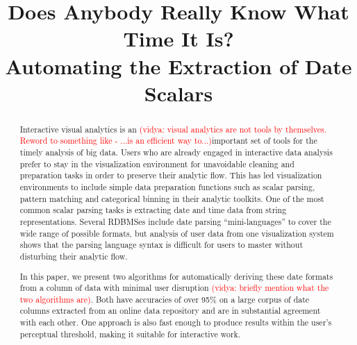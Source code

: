 \documentclass[conference]{IEEEtran}
\newcommand{\vidya}[1]{\textcolor{red}{(vidya: #1)}}
\begin{document}
\title{Does Anybody Really Know What Time It Is?\\
Automating the Extraction of Date Scalars}


\maketitle
\begin{abstract}
Interactive visual analytics is an \vidya{visual analytics are not tools by themselves. Reword to something like - ...is an efficient way to...}important set of tools for the timely analysis of big data. Users who are already engaged in interactive data analysis prefer to stay in the visualization environment for unavoidable cleaning and preparation tasks in order to preserve their analytic flow. This has led visualization environments to include simple data preparation functions such as scalar parsing, pattern matching and categorical binning in their analytic toolkits. One of the most common scalar parsing tasks is extracting date and time data from string representations. Several RDBMSes include date parsing ``mini-languages'' to cover the wide range of possible formats, but analysis of user data from one visualization system shows that the parsing language syntax is difficult for users to master without disturbing their analytic flow.

In this paper, we present two algorithms for automatically deriving these date formats from a column of data with minimal user disruption \vidya{briefly mention what the two algorithms are}. Both have accuracies of over 95\% on a large corpus of date columns extracted from an online data repository and are in substantial agreement with each other. One approach is also fast enough to produce results within the user's perceptual threshold, making it suitable for interactive work.
\end{abstract}
\end{document}

